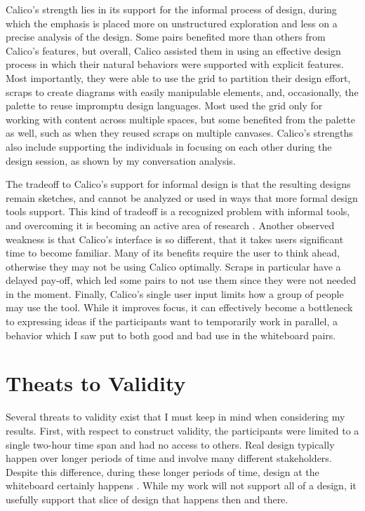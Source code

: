 Calico's strength lies in its support for the informal process of design, during which the emphasis is placed more on unstructured exploration and less on a precise analysis of the design. Some pairs benefited more than others from Calico's features, but overall, Calico assisted them in using an effective design process in which their natural behaviors were supported with explicit features. Most importantly, they were able to use the grid to partition their design effort, scraps to create diagrams with easily manipulable elements, and, occasionally, the palette to reuse impromptu design languages. Most used the grid only for working with content across multiple spaces, but some benefited from the palette as well, such as when they reused scraps on multiple canvases. Calico's strengths also include supporting the individuals in focusing on each other during the design session, as shown by my conversation analysis. 

The tradeoff to Calico's support for informal design is that the resulting designs remain sketches, and cannot be analyzed or used in ways that more formal design tools support. This kind of tradeoff is a recognized problem with informal tools, and overcoming it is becoming an active area of research \citep{Ossher2}. Another observed weakness is that Calico's interface is so different, that it takes users significant time to become familiar. Many of its benefits require the user to think ahead, otherwise they may not be using Calico optimally. Scraps in particular have a delayed pay-off, which led some pairs to not use them since they were not needed in the moment. Finally, Calico's single user input limits how a group of people may use the tool. While it improves focus, it can effectively become a bottleneck to expressing ideas if the participants want to temporarily work in parallel, a behavior which I saw put to both good and bad use in the whiteboard pairs.

\section{Theats to Validity}
\label{threatstovalidity}

Several threats to validity exist that I must keep in mind when considering my results. First, with respect to construct validity, the participants were limited to a single two-hour time span and had no access to others. Real design typically happen over longer periods of time and involve many different stakeholders. Despite this difference, during these longer periods of time, design at the whiteboard certainly happens \citep{cherubini2007let}. While my work will not support all of a design, it usefully support that slice of design that happens then and there.

